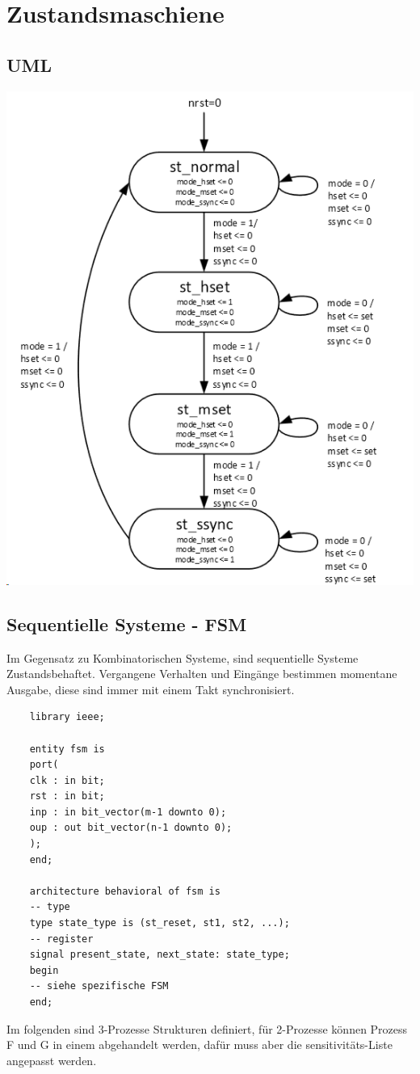 \section{Zustandsmaschiene}
\subsection{UML}
\begin{center}
	\includegraphics[width=\columnwidth]{Images/zustandsmachine}
\end{center}



\subsection{Sequentielle Systeme - FSM}
Im Gegensatz zu Kombinatorischen Systeme, sind sequentielle Systeme Zustandsbehaftet. Vergangene Verhalten und Eingänge bestimmen momentane Ausgabe, diese sind immer mit einem Takt synchronisiert.
\begin{lstlisting}
	library ieee;
	
	entity fsm is
	port(
	clk : in bit;
	rst : in bit;
	inp : in bit_vector(m-1 downto 0);
	oup : out bit_vector(n-1 downto 0);
	);
	end;
	
	architecture behavioral of fsm is
	-- type
	type state_type is (st_reset, st1, st2, ...);
	-- register
	signal present_state, next_state: state_type;
	begin
	-- siehe spezifische FSM
	end;
\end{lstlisting}
Im folgenden sind 3-Prozesse Strukturen definiert, für 2-Prozesse können Prozess F und G in einem abgehandelt werden, dafür muss aber die sensitivitäts-Liste angepasst werden.


